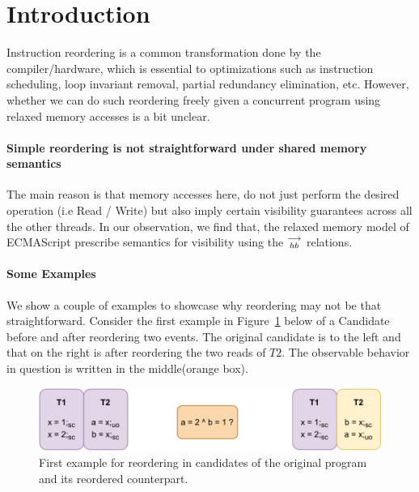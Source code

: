 
\section{Introduction}
    Instruction reordering is a common transformation done by the compiler/hardware, which is essential to optimizations such as instruction scheduling, loop invariant removal, partial redundancy elimination, etc. 
    However, whether we can do such reordering freely given a concurrent program using relaxed memory accesses is a bit unclear. 
     
    \paragraph{Simple reordering is not straightforward under shared memory semantics}
    The main reason is that memory accesses here, do not just perform the desired operation (i.e Read / Write) but also imply certain visibility guarantees across all the other threads.  
    In our observation, we find that, the relaxed memory model of ECMAScript prescribe semantics for visibility using the $\stackrel{\longrightarrow}{_{hb}}$ relations. 
    
    \paragraph{Some Examples}
        We show a couple of examples to showcase why reordering may not be that straightforward. 
        Consider the first example in Figure~\ref{reord:example1(a)} below of a Candidate before and after reordering two events.
        The original candidate is to the left and that on the right is after reordering the two reads of $T2$.
        The observable behavior in question is written in the middle(orange box). 
        \begin{figure}[H]
            \centering
            \includegraphics[scale=0.7]{4.InstructionReordering/0.Intro/ReorderingExample1(a).pdf}
            \caption{First example for reordering in candidates of the original program and its reordered counterpart.}
            \label{reord:example1(a)} 
        \end{figure}
        

